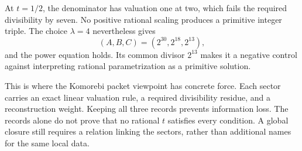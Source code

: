 \begin{example}
At $t=1/2$, the denominator has valuation one at two, which fails the required divisibility by seven. No positive rational scaling produces a primitive integer triple. The choice $\lambda=4$ nevertheless gives
\[
(A,B,C)=(2^{30},2^{18},2^{13}),
\]
and the power equation holds. Its common divisor $2^{13}$ makes it a negative control against interpreting rational parametrization as a primitive solution.
\end{example}
This is where the Komorebi packet viewpoint has concrete force. Each sector carries an exact linear valuation rule, a required divisibility residue, and a reconstruction weight. Keeping all three records prevents information loss. The records alone do not prove that no rational $t$ satisfies every condition. A global closure still requires a relation linking the sectors, rather than additional names for the same local data.
